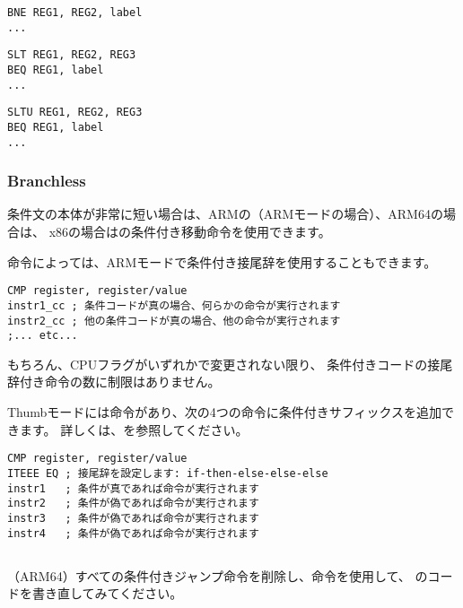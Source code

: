 \begin{lstlisting}[caption=Check for non-equal values,style=customasmMIPS]
BNE REG1, REG2, label
...
\end{lstlisting}

\begin{lstlisting}[caption=Check for less than (signed),style=customasmMIPS]
SLT REG1, REG2, REG3
BEQ REG1, label
...
\end{lstlisting}

\begin{lstlisting}[caption=Check for less than (unsigned),style=customasmMIPS]
SLTU REG1, REG2, REG3
BEQ REG1, label
...
\end{lstlisting}

\subsubsection{Branchless}

条件文の本体が非常に短い場合は、ARMの（ARMモードの場合）、ARM64の場合は、
x86の場合はの条件付き移動命令を使用できます。


命令によっては、ARMモードで条件付き接尾辞を使用することもできます。

\begin{lstlisting}[caption=ARM (\ARMMode),style=customasmARM]
CMP register, register/value
instr1_cc ; 条件コードが真の場合、何らかの命令が実行されます
instr2_cc ; 他の条件コードが真の場合、他の命令が実行されます
;... etc...
\end{lstlisting}

もちろん、CPUフラグがいずれかで変更されない限り、
条件付きコードの接尾辞付き命令の数に制限はありません。


Thumbモードには命令があり、次の4つの命令に条件付きサフィックスを追加できます。
詳しくは、を参照してください。

\begin{lstlisting}[caption=ARM (\ThumbMode),style=customasmARM]
CMP register, register/value
ITEEE EQ ; 接尾辞を設定します: if-then-else-else-else
instr1   ; 条件が真であれば命令が実行されます
instr2   ; 条件が偽であれば命令が実行されます
instr3   ; 条件が偽であれば命令が実行されます
instr4   ; 条件が偽であれば命令が実行されます
\end{lstlisting}

\subsection{\Exercise}

（ARM64）すべての条件付きジャンプ命令を削除し、命令を使用して、
 のコードを書き直してみてください。
